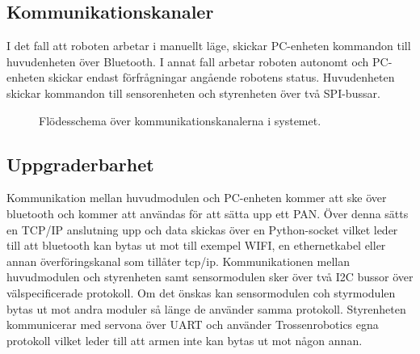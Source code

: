 \subsection{Kommunikationskanaler}
I det fall att roboten arbetar i manuellt läge, skickar PC-enheten kommandon till huvudenheten över Bluetooth. I annat fall arbetar roboten autonomt och PC-enheten skickar endast förfrågningar angående robotens status. Huvudenheten skickar kommandon till sensorenheten och styrenheten över två SPI-bussar.

\begin{figure}[h]
\center
\scalebox{0.6}{}
\caption{Flödesschema över kommunikationskanalerna i systemet.}
\end{figure}

\subsection{Uppgraderbarhet}
Kommunikation mellan huvudmodulen och PC-enheten kommer att ske över bluetooth och kommer att användas för att sätta upp ett PAN. Över denna sätts en TCP/IP anslutning upp och data skickas över en Python-socket vilket leder till att bluetooth kan bytas ut mot till exempel WIFI, en ethernetkabel eller annan överföringskanal som tillåter tcp/ip.\newline
\newline
Kommunikationen mellan huvudmodulen och styrenheten samt sensormodulen sker över två I2C bussor över välspecificerade protokoll. Om det önskas kan sensormodulen coh styrmodulen bytas ut mot andra moduler så länge de använder samma protokoll. Styrenheten kommunicerar med servona över UART och använder Trossenrobotics egna protokoll vilket leder till att armen inte kan bytas ut mot någon annan.
